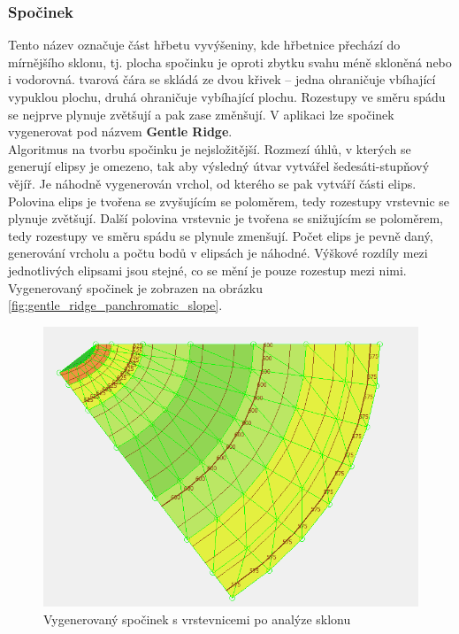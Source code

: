 \documentclass[a4paper,11pt,twoside]{article}
\begin{document}
\subsubsection{Spočinek}
Tento název označuje část hřbetu vyvýšeniny, kde hřbetnice přechází do mírnějšího sklonu, tj. plocha spočinku je oproti zbytku svahu méně skloněná nebo i vodorovná. tvarová čára se skládá ze dvou křivek -- jedna ohraničuje vbíhající vypuklou plochu, druhá ohraničuje vybíhající plochu. Rozestupy ve směru spádu se nejprve plynuje zvětšují a pak zase změnšují. V aplikaci lze spočinek vygenerovat pod názvem \textbf{Gentle Ridge}. \\
\indent Algoritmus na tvorbu spočinku je nejsložitější. Rozmezí úhlů, v kterých se generují elipsy je omezeno, tak aby výsledný útvar vytvářel šedesáti-stupňový vějíř. Je náhodně vygenerován vrchol, od kterého se pak vytváří části elips. Polovina elips je tvořena se zvyšujícím se poloměrem, tedy rozestupy vrstevnic se plynuje zvětšují. Další polovina vrstevnic je tvořena se snižujícím se poloměrem, tedy rozestupy ve směru spádu se plynule zmenšují. Počet elips je pevně daný, generování vrcholu a počtu bodů v elipsách je náhodné. Výškové rozdíly mezi jednotlivých elipsami jsou stejné, co se mění je pouze rozestup mezi nimi. Vygenerovaný spočinek je zobrazen na obrázku \ref{fig:gentle_ridge_panchromatic_slope}.

\vspace{0.2cm}
\begin{figure}[hbt!] 
\begin{center}
\includegraphics[width=12cm]{pictures/gentle_ridge_colorful_slope.PNG} 
\caption[Vygenerovaný spočinek s vrstevnicemi po analýze sklonu]{Vygenerovaný spočinek s vrstevnicemi po analýze sklonu}
\label{fig:gentle_ridge_colorful_slope}
\end{center}
\end{figure}
\end{document}
